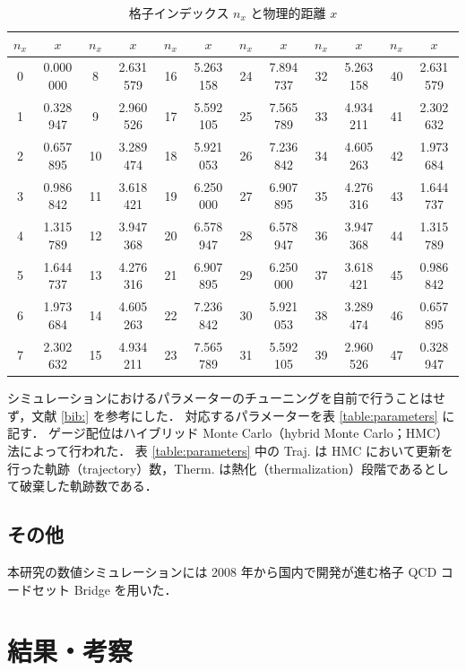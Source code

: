 \documentclass[dvipdfmx, a4paper]{jarticle}
\numberwithin{equation}{section}
\begin{document}
\begin{table}[b]
  \caption{格子インデックス $n_x$ と物理的距離 $x$}
  \label{table:index}  
  \centering
  \begin{tabular}{cccccccccccc}
    \hline\hline
    $n_x$ & $x$ & $n_x$ & $x$ & $n_x$ & $x$ & $n_x$ & $x$ & $n_x$ & $x$ & $n_x$ & $x$\\
    \hline
    0 & 0.000 000 &  8  & 2.631 579 &  16 & 5.263 158 &  24 & 7.894 737  & 32 & 5.263 158  & 40 & 2.631 579\\
    1 & 0.328 947 &  9  & 2.960 526 &  17 & 5.592 105 &  25 & 7.565 789  & 33 & 4.934 211  & 41 & 2.302 632\\
    2 & 0.657 895 &  10 & 3.289 474 &  18 & 5.921 053 &  26 & 7.236 842  & 34 & 4.605 263  & 42 & 1.973 684\\
    3 & 0.986 842 &  11 & 3.618 421 &  19 & 6.250 000 &  27 & 6.907 895  & 35 & 4.276 316  & 43 & 1.644 737\\
    4 & 1.315 789 &  12 & 3.947 368 &  20 & 6.578 947 &  28 & 6.578 947  & 36 & 3.947 368  & 44 & 1.315 789\\
    5 & 1.644 737 &  13 & 4.276 316 &  21 & 6.907 895 &  29 & 6.250 000  & 37 & 3.618 421  & 45 & 0.986 842\\
    6 & 1.973 684 &  14 & 4.605 263 &  22 & 7.236 842 &  30 & 5.921 053  & 38 & 3.289 474  & 46 & 0.657 895\\
    7 & 2.302 632 &  15 & 4.934 211 &  23 & 7.565 789 &  31 & 5.592 105  & 39 & 2.960 526  & 47 & 0.328 947\\
    \hline\hline
  \end{tabular}
\end{table}


シミュレーションにおけるパラメーターのチューニングを自前で行うことはせず，文献 \ref{bib:} を参考にした．
対応するパラメーターを表 \ref{table:parameters} に記す．
ゲージ配位はハイブリッド Monte Carlo（hybrid Monte Carlo；HMC）法によって行われた．
表 \ref{table:parameters} 中の Traj. は HMC において更新を行った軌跡（trajectory）数，Therm. は熱化（thermalization）段階であるとして破棄した軌跡数である．

\subsection{その他}
本研究の数値シミュレーションには 2008 年から国内で開発が進む格子 QCD コードセット Bridge\raisebox{0.5mm}{{\small ++}} を用いた．

\newpage
\section{結果・考察}
\end{document}
